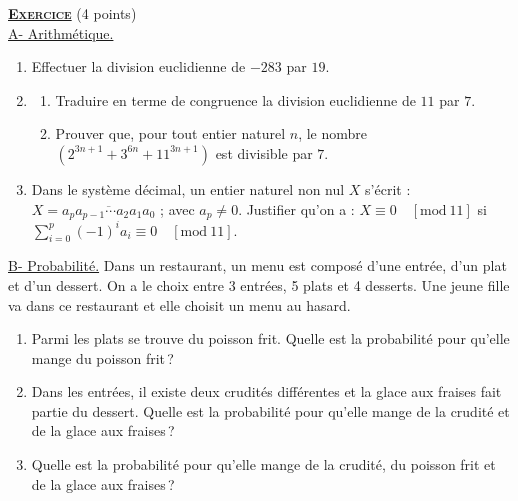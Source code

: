 \providecommand{\dx}{\mathrm{d}x}
\providecommand{\Re}[1]{\mathrm{Re}\left( #1 \right)}
\providecommand{\Im}[1]{\mathrm{Im}\left( #1 \right)}
\providecommand{\dt}{\mathrm{d}t}
\providecommand{\Ouv}{(O;\vec{u},\vec{v})}
\providecommand{\mes}[2]{\mathrm{mes}\left( \widehat{ \overrightarrow{#1} ; \overrightarrow{#2} } \right)}
\providecommand{\D}{(\mathscr{D})}
\providecommand{\Courbe}{(\mathscr{C})}
\providecommand{\congru}[3]{#1 \equiv #2 \quad \left[ \mathrm{mod}~#3\right]}
%
\noindent \underline{\textsc{\textbf{Exercice}}} (4 points) \\%
      \underline{A- Arithm\'etique.} 
            \begin{enumerate}
                  \item Effectuer la division euclidienne de $-283$ par $19$.
                  \item \begin{enumerate}
                              \item Traduire en terme de congruence la division euclidienne de $11$ par $7$.
                              \item Prouver que, pour tout entier naturel $n$, le nombre 
                                    $(2^{3n+1} + 3^{6n} + 11^{3n+1})$ est divisible par $7$.
                        \end{enumerate}
                  \item Dans le syst\`eme d\'ecimal, un entier naturel non nul $X$ s'\'ecrit : 
                        $X = \overline{a_p a_{p-1} \cdots a_2 a_1 a_0}$ ; avec $a_p \neq 0$.
                        Justifier qu'on a : $\congru{X}{0}{11}$ si 
                        $
                              \displaystyle{
                                    \congru{\sum_{i=0}^{p} (-1)^i a_i }{0}{11}
                              }
                        $.
            \end{enumerate}
      \underline{B- Probabilit\'e.} \newline
            Dans un restaurant, un menu est compos\'e d'une entr\'ee, d'un plat et d'un dessert.
            On a le choix entre 3 entr\'ees, 5 plats et 4 desserts.
            Une jeune fille va dans ce restaurant et elle choisit un menu au hasard.
            \begin{enumerate}
                  \item Parmi les plats se trouve du poisson frit.
                        Quelle est la probabilit\'e pour qu'elle mange du poisson frit\,?
                  \item Dans les entr\'ees, il existe deux crudit\'es diff\'erentes et 
                        la glace aux fraises fait partie du dessert.
                        Quelle est la probabilit\'e pour qu'elle mange de la crudit\'e et de la glace aux fraises\,?
                  \item Quelle est la probabilit\'e pour qu'elle mange de la crudit\'e, 
                        du poisson frit et de la glace aux fraises\,?
            \end{enumerate}
